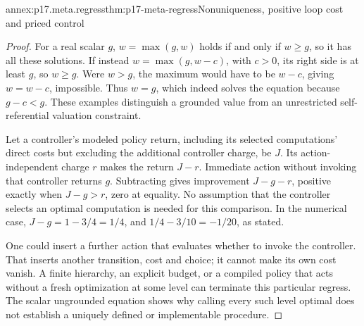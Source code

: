 \begin{annexitem}{annex:p17.meta.regress}{thm:p17-meta-regress}{Nonuniqueness, positive loop cost and priced control}
\begin{proof}
For a real scalar \(g\), \(w=\max(g,w)\) holds if and only
if \(w\geq g\), so it has all these solutions. If instead
\(w=\max(g,w-c)\), with \(c>0\), its right side is at
least \(g\), so \(w\geq g\). Were \(w>g\), the maximum
would have to be \(w-c\), giving \(w=w-c\), impossible.
Thus \(w=g\), which indeed solves the equation because
\(g-c<g\). These examples distinguish a grounded value from
an unrestricted self-referential valuation constraint.

Let a controller's modeled policy return, including its selected
computations' direct costs but excluding the additional controller
charge, be \(J\). Its action-independent charge \(r\) makes
the return \(J-r\). Immediate action without invoking that
controller returns \(g\). Subtracting gives improvement
\(J-g-r\), positive exactly when \(J-g>r\), zero at equality.
No assumption that the controller selects an optimal computation
is needed for this comparison. In the numerical case,
\(J-g=1-3/4=1/4\), and
\(1/4-3/10=-1/20\), as stated.

One could insert a further action that evaluates whether to invoke
the controller. That inserts another transition, cost and choice;
it cannot make its own cost vanish. A finite hierarchy, an
explicit budget, or a compiled policy that acts without a fresh
optimization at some level can terminate this particular regress.
The scalar ungrounded equation shows why calling every such level
optimal does not establish a uniquely defined or implementable
procedure.
\end{proof}
\end{annexitem}

